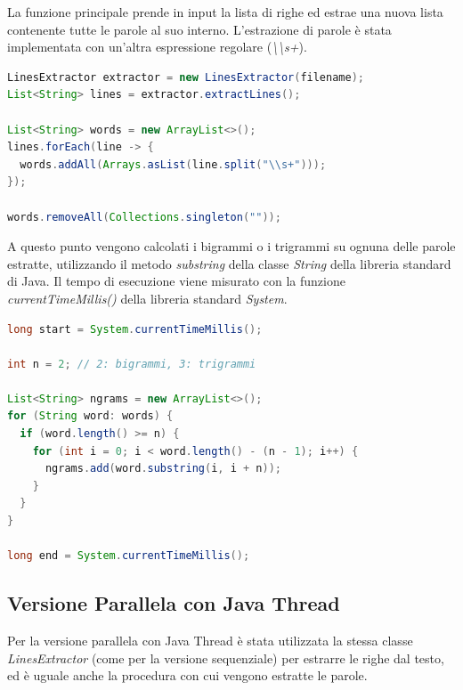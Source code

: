 \documentclass[10pt,twocolumn,letterpaper]{article}
\begin{document}
La funzione principale prende in input la lista di righe ed estrae una nuova lista contenente tutte le parole al suo interno. L'estrazione di parole è stata implementata con un'altra espressione regolare (\textit{\textbackslash \textbackslash s+}). \newline

\begin{lstlisting}[basicstyle=\scriptsize, language=Java, frame=single, caption={Esempio di estrazione di parole in Java},captionpos=b, showstringspaces=false]
LinesExtractor extractor = new LinesExtractor(filename);
List<String> lines = extractor.extractLines();

List<String> words = new ArrayList<>();
lines.forEach(line -> {
  words.addAll(Arrays.asList(line.split("\\s+")));
});

words.removeAll(Collections.singleton(""));
\end{lstlisting}

A questo punto vengono calcolati i bigrammi o i trigrammi su ognuna delle parole estratte, utilizzando il metodo \textit{substring} della classe \textit{String} della libreria standard di Java. Il tempo di esecuzione viene misurato con la funzione \textit{currentTimeMillis()} della libreria standard \textit{System}.\newline

\begin{lstlisting}[basicstyle=\scriptsize, language=Java, frame=single, caption={Esempio di ricerca di bigrammi/trigrammi in Java},captionpos=b, showstringspaces=false]
long start = System.currentTimeMillis();

int n = 2; // 2: bigrammi, 3: trigrammi

List<String> ngrams = new ArrayList<>();
for (String word: words) {
  if (word.length() >= n) {
    for (int i = 0; i < word.length() - (n - 1); i++) {
      ngrams.add(word.substring(i, i + n));
    }
  }
}

long end = System.currentTimeMillis();
\end{lstlisting}

\subsection{Versione Parallela con Java Thread}
Per la versione parallela con Java Thread è stata utilizzata la stessa classe \textit{LinesExtractor} (come per la versione sequenziale) per estrarre le righe dal testo, ed è uguale anche la procedura con cui vengono estratte le parole.
\end{document}
